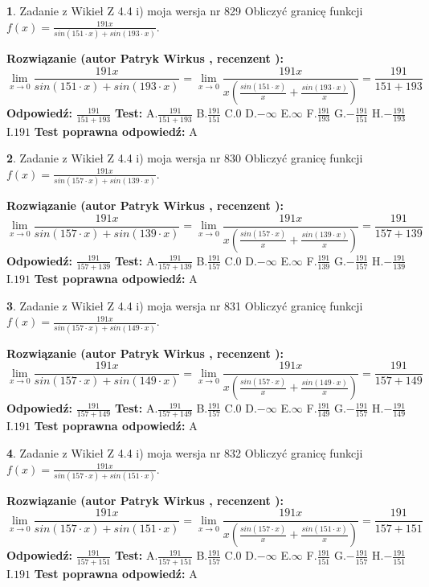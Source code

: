 \documentclass[12pt, a4paper]{article}
\theoremstyle{definition} %
\newtheorem{zad}{}
\newcommand{\zadStart}[1]{\begin{zad}#1\newline}
\newcommand{\zadStop}{\end{zad}}
\newcommand{\rozwStart}[2]{\noindent \textbf{Rozwiązanie (autor #1 , recenzent #2): }\newline}
\newcommand{\rozwStop}{\newline}
\newcommand{\odpStart}{\noindent \textbf{Odpowiedź:}\newline}
\newcommand{\odpStop}{\newline}
\newcommand{\testStart}{\noindent \textbf{Test:}\newline}
\newcommand{\testStop}{\newline}
\newcommand{\kluczStart}{\noindent \textbf{Test poprawna odpowiedź:}\newline}
\newcommand{\kluczStop}{\newline}
\begin{document}
\zadStart{Zadanie z Wikieł Z 4.4 i) moja wersja nr 829}
Obliczyć granicę funkcji $f(x)=\frac{191x}{sin(151\cdot x) +sin(193\cdot x)}$.
\zadStop
\rozwStart{Patryk Wirkus}{}
$$\lim\limits_{x\to 0}\frac{191x}{sin(151\cdot x) +sin(193\cdot x)}=\lim\limits_{x\to 0}\frac{191x}{x(\frac{sin(151\cdot x)}{x}+\frac{sin(193\cdot x)}{x})}=\frac{191}{151+193}$$
\rozwStop
\odpStart
$\frac{191}{151+193}$
\odpStop
\testStart
A.$\frac{191}{151+193}$
B.$\frac{191}{151}$
C.$0$
D.$-\infty$
E.$\infty$
F.$\frac{191}{193}$
G.$-\frac{191}{151}$
H.$-\frac{191}{193}$
I.$191$
\testStop
\kluczStart
A
\kluczStop



\zadStart{Zadanie z Wikieł Z 4.4 i) moja wersja nr 830}
Obliczyć granicę funkcji $f(x)=\frac{191x}{sin(157\cdot x) +sin(139\cdot x)}$.
\zadStop
\rozwStart{Patryk Wirkus}{}
$$\lim\limits_{x\to 0}\frac{191x}{sin(157\cdot x) +sin(139\cdot x)}=\lim\limits_{x\to 0}\frac{191x}{x(\frac{sin(157\cdot x)}{x}+\frac{sin(139\cdot x)}{x})}=\frac{191}{157+139}$$
\rozwStop
\odpStart
$\frac{191}{157+139}$
\odpStop
\testStart
A.$\frac{191}{157+139}$
B.$\frac{191}{157}$
C.$0$
D.$-\infty$
E.$\infty$
F.$\frac{191}{139}$
G.$-\frac{191}{157}$
H.$-\frac{191}{139}$
I.$191$
\testStop
\kluczStart
A
\kluczStop



\zadStart{Zadanie z Wikieł Z 4.4 i) moja wersja nr 831}
Obliczyć granicę funkcji $f(x)=\frac{191x}{sin(157\cdot x) +sin(149\cdot x)}$.
\zadStop
\rozwStart{Patryk Wirkus}{}
$$\lim\limits_{x\to 0}\frac{191x}{sin(157\cdot x) +sin(149\cdot x)}=\lim\limits_{x\to 0}\frac{191x}{x(\frac{sin(157\cdot x)}{x}+\frac{sin(149\cdot x)}{x})}=\frac{191}{157+149}$$
\rozwStop
\odpStart
$\frac{191}{157+149}$
\odpStop
\testStart
A.$\frac{191}{157+149}$
B.$\frac{191}{157}$
C.$0$
D.$-\infty$
E.$\infty$
F.$\frac{191}{149}$
G.$-\frac{191}{157}$
H.$-\frac{191}{149}$
I.$191$
\testStop
\kluczStart
A
\kluczStop



\zadStart{Zadanie z Wikieł Z 4.4 i) moja wersja nr 832}
Obliczyć granicę funkcji $f(x)=\frac{191x}{sin(157\cdot x) +sin(151\cdot x)}$.
\zadStop
\rozwStart{Patryk Wirkus}{}
$$\lim\limits_{x\to 0}\frac{191x}{sin(157\cdot x) +sin(151\cdot x)}=\lim\limits_{x\to 0}\frac{191x}{x(\frac{sin(157\cdot x)}{x}+\frac{sin(151\cdot x)}{x})}=\frac{191}{157+151}$$
\rozwStop
\odpStart
$\frac{191}{157+151}$
\odpStop
\testStart
A.$\frac{191}{157+151}$
B.$\frac{191}{157}$
C.$0$
D.$-\infty$
E.$\infty$
F.$\frac{191}{151}$
G.$-\frac{191}{157}$
H.$-\frac{191}{151}$
I.$191$
\testStop
\kluczStart
A
\kluczStop
\end{document}

